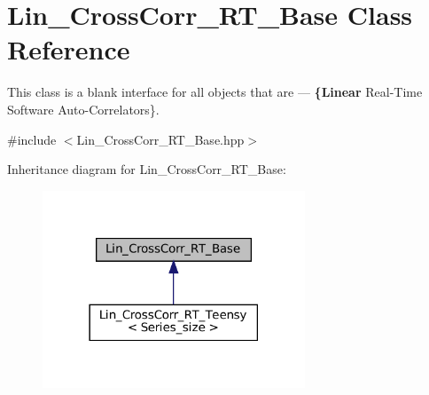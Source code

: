 \hypertarget{classLin__CrossCorr__RT__Base}{}\section{Lin\+\_\+\+Cross\+Corr\+\_\+\+R\+T\+\_\+\+Base Class Reference}
\label{classLin__CrossCorr__RT__Base}


This class is a blank interface for all objects that are — {\bfseries \{Linear} Real-\/\+Time Software Auto-\/\+Correlators\}.  




{\ttfamily \#include $<$Lin\+\_\+\+Cross\+Corr\+\_\+\+R\+T\+\_\+\+Base.\+hpp$>$}



Inheritance diagram for Lin\+\_\+\+Cross\+Corr\+\_\+\+R\+T\+\_\+\+Base\+:\nopagebreak
\begin{figure}[H]
\begin{center}
\leavevmode
\includegraphics[width=222pt]{classLin__CrossCorr__RT__Base__inherit__graph}
\end{center}
\end{figure}
